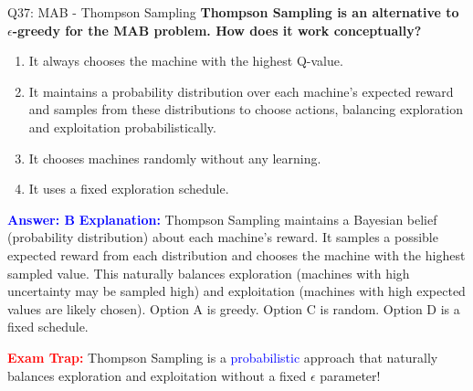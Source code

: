 \documentclass[8pt]{beamer}
\begin{document}
	\begin{frame}{Q37: MAB - Thompson Sampling}
		\fontsize{6.5}{7.5}\selectfont
		\textbf{Thompson Sampling is an alternative to $\epsilon$-greedy for the MAB problem. How does it work conceptually?}
		
		\begin{enumerate}
			\item It always chooses the machine with the highest Q-value.
			\item It maintains a probability distribution over each machine's expected reward and samples from these distributions to choose actions, balancing exploration and exploitation probabilistically.
			\item It chooses machines randomly without any learning.
			\item It uses a fixed exploration schedule.
		\end{enumerate}
		
		\vspace{0.1cm}
		\textcolor{blue}{\textbf{Answer: B}}
		\vspace{0.1cm}
		\textcolor{blue}{\textbf{Explanation:}} Thompson Sampling maintains a Bayesian belief (probability distribution) about each machine's reward. It samples a possible expected reward from each distribution and chooses the machine with the highest sampled value. This naturally balances exploration (machines with high uncertainty may be sampled high) and exploitation (machines with high expected values are likely chosen). Option A is greedy. Option C is random. Option D is a fixed schedule.
		
		\textcolor{red}{\textbf{Exam Trap:}} Thompson Sampling is a \textcolor{blue}{probabilistic} approach that naturally balances exploration and exploitation without a fixed $\epsilon$ parameter!
	\end{frame}
	
\end{document}
